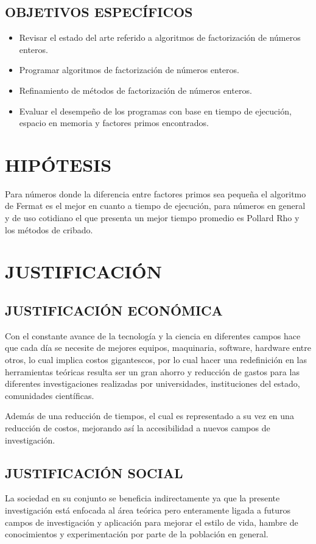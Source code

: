         \subsection{OBJETIVOS ESPECÍFICOS}
        \begin{itemize}
            \item{Revisar el estado del arte referido a algoritmos de factorización de números enteros.}
            \item{Programar algoritmos de factorización de números enteros.}
            \item{Refinamiento de métodos de factorización de números enteros.}
            \item{Evaluar el desempeño de los programas con base en tiempo de ejecución, espacio en memoria y factores primos encontrados.}
        \end{itemize}
    
    \section{HIPÓTESIS}
    Para números donde la diferencia entre factores primos sea pequeña el algoritmo de Fermat es el mejor en cuanto a tiempo de ejecución, para números en general y de uso cotidiano el que presenta un mejor tiempo promedio es Pollard Rho y los métodos de cribado.
    
    \section{JUSTIFICACIÓN}
        \subsection{JUSTIFICACIÓN ECONÓMICA}
        Con el constante avance de la tecnología y la ciencia en diferentes campos hace que cada día se necesite de mejores equipos, maquinaria, software, hardware entre otros, lo cual implica costos gigantescos, por lo cual hacer una redefinición en las herramientas teóricas resulta ser un gran ahorro y reducción de gastos para las diferentes investigaciones realizadas por universidades, instituciones del estado, comunidades científicas.

        Además de una reducción de tiempos, el cual es representado a su vez en una reducción de costos, mejorando así la accesibilidad a nuevos campos de investigación.
        
        \subsection{JUSTIFICACIÓN SOCIAL}
        La sociedad en su conjunto se beneficia indirectamente ya que la presente investigación está enfocada al área teórica pero enteramente ligada a futuros campos de investigación y aplicación para mejorar el estilo de vida, hambre de conocimientos y experimentación por parte de la población en general.

